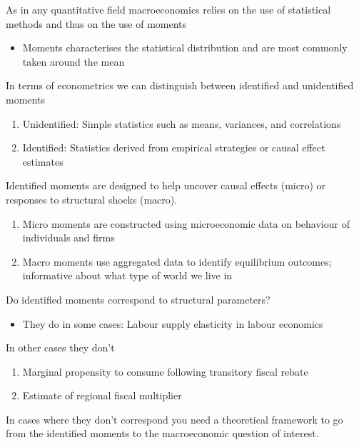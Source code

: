 \documentclass{beamer}
\begin{document}
\begin{frame}
  As in any quantitative field macroeconomics relies on the use of statistical methods and thus on the use of moments
  \begin{itemize}
    \item Moments characterises the statistical distribution and are most commonly taken around the mean
  \end{itemize}
  \medskip
  In terms of econometrics we can distinguish between identified and unidentified moments
  \begin{enumerate}
    \item Unidentified: Simple statistics such as means, variances, and correlations
    \item Identified: Statistics derived from empirical strategies or causal effect estimates 
  \end{enumerate}
\end{frame}

\begin{frame}
 Identified moments are designed to help uncover causal effects (micro) or responses to structural shocks (macro).
 \begin{enumerate}
   \item Micro moments are constructed using microeconomic data on behaviour of individuals and firms
   \item Macro moments use aggregated data to identify equilibrium outcomes; informative about what type of world we live in 
  \end{enumerate} 
\end{frame}

\begin{frame}
  Do identified moments correspond to structural parameters?
  \begin{itemize}
    \item They do in some cases: Labour supply elasticity in labour economics
  \end{itemize}
  \medskip
  In other cases they don't
  \begin{enumerate}
    \item Marginal propensity to consume following transitory fiscal rebate
    \item Estimate of regional fiscal multiplier
  \end{enumerate}
  \medskip
  In cases where they don't correspond you need a theoretical framework to go from the identified moments to the macroeconomic question of interest.
\end{frame}
\end{document}
